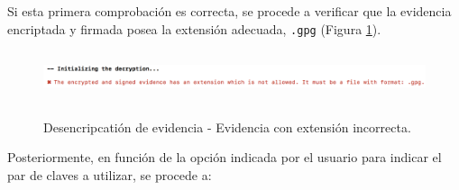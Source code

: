 \documentclass[12pt,a4paper, twoside]{report}
\begin{document}
	Si esta primera comprobación es correcta, se procede a verificar que la evidencia encriptada y firmada posea la extensión adecuada, \texttt{.gpg} (Figura \ref{fig:userguide_evidence_invalidFormat}). 

		\begin{figure}[!ht]   
			\caption{Desencripcatión de evidencia - Evidencia con extensión incorrecta.} 
			\begin{center} 					\includegraphics[width=16cm,height=1.5cm]{Images/userGuide/evidence/evidence_invalidFormat} \\
				\label{fig:userguide_evidence_invalidFormat} 
			\end{center}  
		\end{figure}
	
	Posteriormente, en función de la opción indicada por el usuario para indicar el par de claves a utilizar, se procede a:
\end{document}
